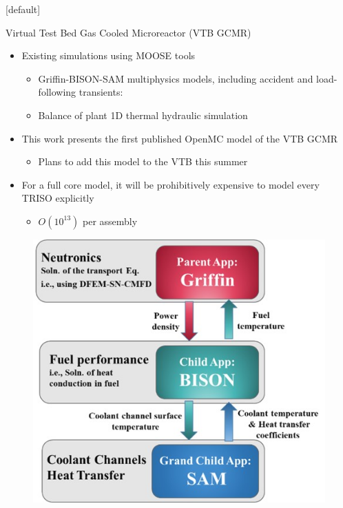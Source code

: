 \documentclass[9pt,t,aspectratio=169]{beamer}
\makeatletter
\newenvironment{withoutheadline}{
       \setbeamertemplate{headline}[default]
       \def\beamer@entrycode{\vspace*{-\headheight}}
    }{}
\makeatother
\begin{document}
\begin{withoutheadline}
\begin{frame}{Virtual Test Bed Gas Cooled Microreactor (VTB GCMR)}
    \pause
    \LARGE
    \begin{minipage}[t]{0.55\linewidth}
        \begin{itemize}
            \item<2-> Existing simulations using MOOSE tools
            \begin{itemize}
                \Large
                \item<2-> Griffin-BISON-SAM multiphysics models, including accident and load-following transients:  \cite{Stauff-applications-2022,Abdelhameed-ANS-2022, HF_MRs_ANL}
                \item<2-> Balance of plant 1D thermal hydraulic simulation \cite{Duchnowski_plant_balance_2022}
            \end{itemize}
            \item<3-> This work presents the first published OpenMC model of the VTB GCMR
            \begin{itemize}
                \Large
                \item<3->Plans to add this model to the VTB this summer
            \end{itemize}
            \item<4-> For a full core model, it will be prohibitively expensive to model every TRISO explicitly
            \begin{itemize}
                \Large
                \item<4-> $O(10^{13})$ per assembly
            \end{itemize}
        \end{itemize}
    \end{minipage}
    \hfill%
    \begin{minipage}[t]{0.4\linewidth}
        \begin{figure}
            \centering
            \includegraphics[width=\linewidth]{figures/gcmr_preliminary_mutliapps.png}

\end{figure}
\end{minipage}
\end{frame}
\end{withoutheadline}
\end{document}
